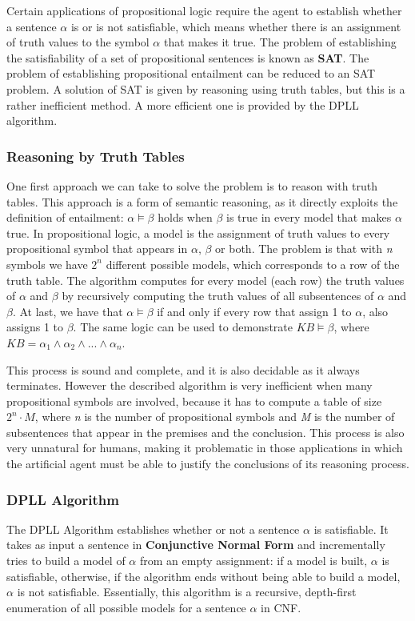 \documentclass{article}
\begin{document}
Certain applications of propositional logic require the agent to establish whether a sentence $\alpha$ is or is not satisfiable, which means whether there is an assignment of truth values to the symbol $\alpha$ that makes it true. The problem of establishing the satisfiability of a set of propositional sentences is known as \textbf{SAT}. The problem of establishing propositional entailment can be reduced to an SAT problem. A solution of SAT is given by reasoning using truth tables, but this is a rather inefficient method. A more efficient one is provided by the DPLL algorithm.

\subsubsection{Reasoning by Truth Tables}
One first approach we can take to solve the problem is to reason with truth tables. This approach is a form of semantic reasoning, as it directly exploits the definition of entailment: $\alpha\models\beta$ holds when $\beta$ is true in every model that makes $\alpha$ true. In propositional logic, a model is the assignment of truth values to every propositional symbol that appears in $\alpha$, $\beta$ or both. The problem is that with \textit{n} symbols we have $2^n$ different possible models, which corresponds to a row of the truth table. The algorithm computes for every model (each row) the truth values of $\alpha$ and $\beta$ by recursively computing the truth values of all subsentences of $\alpha$ and $\beta$. At last, we have that $\alpha\models\beta$ if and only if every row that assign 1 to $\alpha$, also assigns 1 to $\beta$. The same logic can be used to demonstrate $KB\models\beta$, where $KB=\alpha_1\land\alpha_2\land...\land\alpha_n$.

This process is sound and complete, and it is also decidable as it always terminates. However the described algorithm is very inefficient when many propositional symbols are involved, because it has to compute a table of size $2^n\cdot M$, where \textit{n} is the number of propositional symbols and \textit{M} is the number of subsentences that appear in the premises and the conclusion. This process is also very unnatural for humans, making it problematic in those applications in which the artificial agent must be able to justify the conclusions of its reasoning process.

\subsubsection{DPLL Algorithm}
The DPLL Algorithm establishes whether or not a sentence $\alpha$ is satisfiable. It takes as input a sentence in \textbf{Conjunctive Normal Form} and incrementally tries to build a model of $\alpha$ from an empty assignment: if a model is built, $\alpha$ is satisfiable, otherwise, if the algorithm ends without being able to build a model, $\alpha$ is not satisfiable. Essentially, this algorithm is a recursive, depth-first enumeration of all possible models for a sentence $\alpha$ in CNF.
\end{document}
